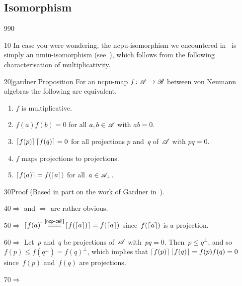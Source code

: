 \subsection{Isomorphism}
\begin{parsec}{990}%
\begin{point}{10}%
In case you were wondering,
the ncpu-isomorphism
we encountered in~
is simply an nmiu-isomorphism 
(see~), which follows
from the following characterisation of multiplicativity.
\end{point}
\begin{point}{20}[gardner]{Proposition}%
For an ncpu-map $f\colon \mathscr{A}\to\mathscr{B}$
between von Neumann algebras
the following are equivalent.
\begin{enumerate}
\item
\label{gardner-1}
$f$ is multiplicative.
\item
\label{gardner-2}
$f(a)f(b)=0$
for all $a,b\in\mathscr{A}$ with $ab=0$.
\item
\label{gardner-3}
$\left\lceil f(p)\right\rceil\left\lceil f(q)\right\rceil=0$
for all projections $p$ and~$q$ of~$\mathscr{A}$ with $pq=0$.
\item
\label{gardner-4}
$f$ maps projections to projections.
\item
\label{gardner-5}
$\left\lceil f(a)\right\rceil=f(\left\lceil a\right\rceil)$
for all~$a\in\mathscr{A}_+$.
\end{enumerate}
\spacingfix%
\begin{point}{30}{Proof}%
(Based in part on the work of Gardner in~\cite{gardner}).
\begin{point}{40}{$\Longrightarrow$
 and $\Longrightarrow$}
	are rather obvious.
\end{point}
\begin{point}{50}{$\Longrightarrow$}%
 $\ceil{f(a)}
\smash{\overset{\sref{ncp-ceil}}{=\joinrel=\joinrel=}}
\ceil{f(\ceil{a})}
=f(\ceil{a})$
since~$f(\left\lceil a\right\rceil)$ is a projection.
\end{point}
\begin{point}{60}{$\Longrightarrow$}%
Let~$p$ and~$q$ be projections of~$\mathscr{A}$ with~$pq=0$.
Then~$p\leq q^\perp$, and so~$f(p)\leq f(q^\perp)=f(q)^\perp$,
which implies that $\left\lceil f(p)\right\rceil\left\lceil f(q)\right\rceil
=f(p)f(q)=0$ since~$f(p)$ and~$f(q)$ are projections.
\end{point}
\begin{point}{70}{$\Longrightarrow$}%

\end{point}
\end{point}
\end{point}
\end{parsec}
